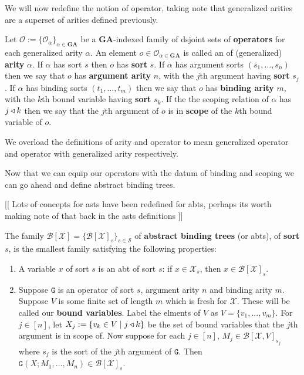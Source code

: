 We will now redefine the notion of operator, taking note that generalized arities are a superset of arities defined previously.

\begin{defin}
    Let $\mathcal{O}:=\{ \mathcal{O}_\alpha\}_{\alpha \in \mathbf{GA}}$ be a $\mathbf{GA}$-indexed family of dsjoint sets of \textbf{operators} for each generalized arity $\alpha$. An element $o \in \mathcal{O}_{\alpha \in \mathbf{GA}}$ is called an  of (generalized) \textbf{arity} $\alpha$. If $\alpha$ has sort $s$ then $o$ has \textbf{sort} $s$. If $\alpha$ has argument sorts $(s_1,\dots,s_n)$ then we say that $o$ has \textbf{argument arity} $n$, with the $j$th argument having \textbf{sort} $s_j$. If $\alpha$ has binding sorts $(t_1,\dots,t_m)$ then we say that $o$ has \textbf{binding arity} $m$, with the $k$th bound variable having \textbf{sort} $s_k$. If the the scoping relation of $\alpha$ has $j \triangleleft k$ then we say that the $j$th argument of $o$ is in \textbf{scope} of the $k$th bound variable of $o$. 
\end{defin}

\begin{remark}
    We overload the definitions of arity and operator to mean generalized operator and operator with generalized arity respectively.
\end{remark}

Now that we can equip our operators with the datum of binding and scoping we can go ahead and define abstract binding trees.

[[ Lots of concepts for asts have been redefined for abts,
perhaps its worth making note of that back in the asts definitions ]]

\begin{defin}\label{abt}
    The family $\mathcal{B}[\mathcal{X}] = \{ \mathcal{B}[\mathcal{X}]_s \}_{s \in \mathcal{S}}$ of \textbf{abstract binding trees} (or abts), of \textbf{sort} $s$, is the smallest family satisfying the following properties:
    
    \begin{enumerate}
        \item A variable $x$ of sort $s$ is an abt of sort $s$: if $x \in \mathcal{X}_s$, then $x \in \mathcal{B}[\mathcal{X}]_s$.
        \item Suppose $\mathtt{G}$ is an operator of sort $s$, argument arity $n$ and binding arity $m$. Suppose $V$ is some finite set of length $m$ which is fresh for $\mathcal{X}$. These will be called our \textbf{bound variables}. Label the elments of $V$ as $V= \{ v_1, \dots, v_m\}$. For $j\in [n]$, let $X_j:=\{ v_k \in V \mid j \triangleleft k\}$ be the set of bound variables that the $j$th argument is in scope of. Now suppose for each $j \in [n]$, $M_j \in \mathcal{B}[\mathcal{X},V]_{s_j}$ where $s_j$ is the sort of the $j$th argument of $\mathtt{G}$. Then $\mathtt{G}(X;M_1,\dots, M_n) \in \mathcal{B}[\mathcal{X}]_s$.
    \end{enumerate}
\end{defin}

